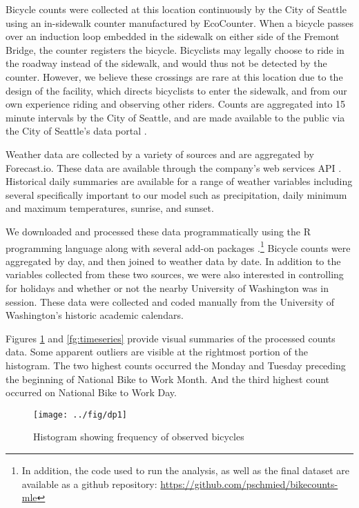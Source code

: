 \documentclass[12pt,letterpaper,article,twocolumn]{memoir}
\begin{document}
Bicycle counts were collected at this location continuously by the
City of Seattle using an in-sidewalk counter manufactured by
EcoCounter. When a bicycle passes over an induction loop embedded in
the sidewalk on either side of the Fremont Bridge, the counter
registers the bicycle. Bicyclists may legally choose to ride in the
roadway instead of the sidewalk, and would thus not be detected by the
counter. However, we believe these crossings are rare at this location
due to the design of the facility, which directs bicyclists to enter
the sidewalk, and from our own experience riding and observing other
riders. Counts are aggregated into 15 minute intervals by the City of
Seattle, and are made available to the public via the City of
Seattle's data
portal \parencite{City-of-Seattle:aa,City-of-Seattle:ab}.

Weather data are collected by a variety of sources and are aggregated
by Forecast.io. These data are available through the company's web
services API \parencite{The-Dark-Sky-Company:aa}. Historical daily
summaries are available for a range of weather variables including
several specifically important to our model such as precipitation,
daily minimum and maximum temperatures, sunrise, and sunset.

We downloaded and processed these data programmatically using the R
programming language along with several add-on
packages \parencite{Grolemund:2011aa,Wickham:2011aa,Couture-Beil:2014aa,Lang:2014aa,R-Core-Team:2014aa}.\footnote{In
addition, the code used to run the analysis, as well as the final
dataset are available as a github repository: \url{https://github.com/pschmied/bikecounts-mle}}
Bicycle counts were aggregated by day, and then joined to weather data
by date. In addition to the variables collected from these two
sources, we were also interested in controlling for holidays and
whether or not the nearby University of Washington was in session.
These data were collected and coded manually from the University of
Washington's historic academic calendars.

Figures \ref{fg:hist} and \ref{fg:timeseries} provide visual summaries
of the processed counts data. Some apparent outliers are visible at
the rightmost portion of the histogram. The two highest counts
occurred the Monday and Tuesday preceding the beginning of National
Bike to Work Month. And the third highest count occurred on National
Bike to Work Day.

\begin{figure}[h!]
  \centering
  \texttt{[image: ../fig/dp1]}
  \caption{Histogram showing frequency of observed bicycles}
  \label{fg:hist}
\end{figure}
\end{document}

